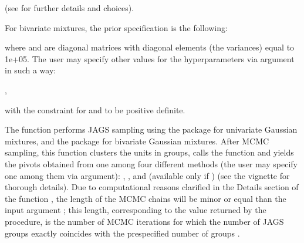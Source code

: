 \documentclass[a4paper]{book}
\begin{document}
\begin{Details}
(see  for further details and choices).

For bivariate mixtures, the prior specification is the following:


where  and  are diagonal matrices
with diagonal elements (the variances)
equal to 1e+05. The user may specify other values for the hyperparameters
 via  argument in such a way:

,

with the constraint for  and  to be positive definite.

The function performs JAGS sampling using the  package for univariate Gaussian mixtures, and the 
package for bivariate Gaussian mixtures. After MCMC sampling, this function
clusters the units in  groups,
calls the  function and yields the
pivots obtained from one among four different
methods (the user may specify one among them via 
argument):
, , 
and  (available only if )
(see the vignette for thorough details). Due to computational reasons
clarified in the Details section of the function , the
length of the MCMC chains will be minor or equal than the input
argument ; this length, corresponding to the value
 returned by the procedure, is the number of
MCMC iterations for which
the number of JAGS groups exactly coincides with the prespecified
number of groups .
\end{Details}
%
\end{document}

